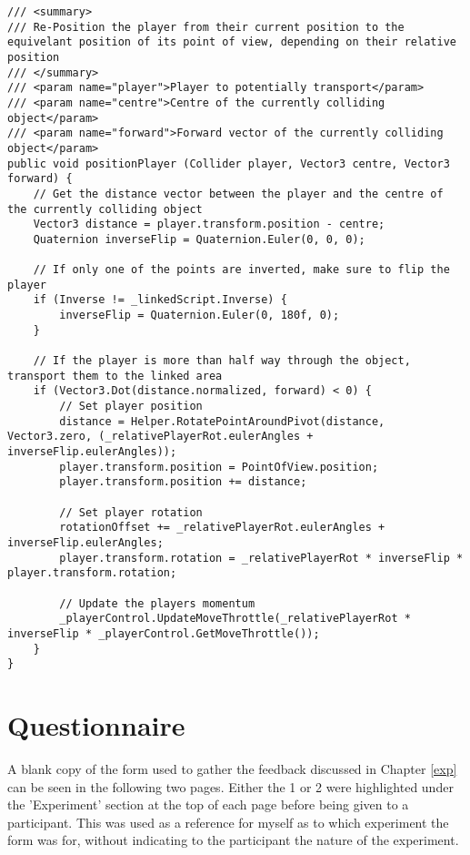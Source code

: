 		\begin{lstlisting}[caption="Player Positioning - CameraRenderPosition.cs", label=appendix:code:player, firstnumber=125]
/// <summary>
/// Re-Position the player from their current position to the equivelant position of its point of view, depending on their relative position
/// </summary>
/// <param name="player">Player to potentially transport</param>
/// <param name="centre">Centre of the currently colliding object</param>
/// <param name="forward">Forward vector of the currently colliding object</param>
public void positionPlayer (Collider player, Vector3 centre, Vector3 forward) {
	// Get the distance vector between the player and the centre of the currently colliding object
	Vector3 distance = player.transform.position - centre;
	Quaternion inverseFlip = Quaternion.Euler(0, 0, 0);

	// If only one of the points are inverted, make sure to flip the player
	if (Inverse != _linkedScript.Inverse) {
		inverseFlip = Quaternion.Euler(0, 180f, 0);
	}

	// If the player is more than half way through the object, transport them to the linked area
	if (Vector3.Dot(distance.normalized, forward) < 0) {
		// Set player position
		distance = Helper.RotatePointAroundPivot(distance, Vector3.zero, (_relativePlayerRot.eulerAngles + inverseFlip.eulerAngles));
		player.transform.position = PointOfView.position;
		player.transform.position += distance;

		// Set player rotation
		rotationOffset += _relativePlayerRot.eulerAngles + inverseFlip.eulerAngles;
		player.transform.rotation = _relativePlayerRot * inverseFlip * player.transform.rotation;

		// Update the players momentum
		_playerControl.UpdateMoveThrottle(_relativePlayerRot * inverseFlip * _playerControl.GetMoveThrottle());
	}
}
		\end{lstlisting}

	\section{Questionnaire}
		\label{appendix:question}
		A blank copy of the form used to gather the feedback discussed in Chapter \ref{exp} can be seen in the following two pages. Either the 1 or 2 were highlighted under the 'Experiment' section at the top of each page before being given to a participant. This was used as a reference for myself as to which experiment the form was for, without indicating to the participant the nature of the experiment.

